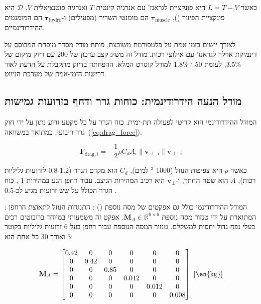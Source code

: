 כאשר $L = T - V$ היא פונקציית לגראנז' עם אנרגיה קינטית $T$ ואנרגיה פוטנציאלית $V$, $\mathcal{D}$ היא פונקציית הפיזור (), $\boldsymbol{\tau}_{\text{muscle}}$ הם מומנטי השריר (מפעילים) ו-$\boldsymbol{\tau}_{\text{hydro}}$ הם המומנטים ההידרודינמיים.

לצורך יישום בזמן אמת על פלטפורמת  משובצת, פותח מודל מסדר מופחת המבוסס על דינמיקת אוילר-לגראנז' עם אילוצי רכות. מודל זה משיג קצב עדכון של 200  עם דיוק מיקום של 3.5\%, לעומת 50  ו-1.8\% למודל קוסרט המלא. ההפחתה בדיוק מתקבלת על הדעת לאור דרישות הזמן-אמת של מערכת הניווט.

\subsection{מודל הנעה הידרודינמית: כוחות גרר ודחף בזרועות גמישות}
\label{sec:kinematics_hydro}

המודל ההידרודינמי הוא קריטי לפעולה תת-ימית. כוח הגרר על כל מקטע זרוע נתון על ידי חוק גרר ריבועי, כמתואר במשוואה~(\ref{eq:drag_force}).

\begin{equation}
\mathbf{F}_{\text{drag},i} = -\frac{1}{2} \rho C_d A_i \|\mathbf{v}_{\perp,i}\| \mathbf{v}_{\perp,i}
\label{eq:drag_force}
\end{equation}

כאשר $\rho$ היא צפיפות הנוזל (1000 $^3$ למים), $C_d$ הוא מקדם הגרר (0.8-1.2 לזרועות גליליות רכות), $A$ הוא שטח החתך, ו-$\mathbf{v}_\perp$ היא רכיב המהירות הניצב. עבור רחפן הנע במהירות 1 , כוח הגרר הכולל על שש זרועות מגיע לכ-0.5 .

המודל ההידרודינמי כולל גם אפקטים של מסה נוספת () : התנגדות הנוזל לתאוצת הרחפן : המתוארת על ידי טנזור מסה נוספת $\mathbf{M}_A \in \mathbb{R}^{6 \times 6}$. אפקט זה משמעותי במיוחד ברובוטים רכים בעלי נפח גדול יחסית למשקלם. טנזור המסה הנוספת עבור רחפן בעל 6 זרועות גליליות בקוטר 3  ואורך 30  כל אחת הוא:

\begin{equation}
\mathbf{M}_A = \begin{bmatrix}
0.42 & 0 & 0 & 0 & 0 & 0 \\
0 & 0.42 & 0 & 0 & 0 & 0 \\
0 & 0 & 0.85 & 0 & 0 & 0 \\
0 & 0 & 0 & 0.012 & 0 & 0 \\
0 & 0 & 0 & 0 & 0.012 & 0 \\
0 & 0 & 0 & 0 & 0 & 0.008
\end{bmatrix} \text{ [\en{kg}]}
\label{eq:added_mass}
\end{equation}


